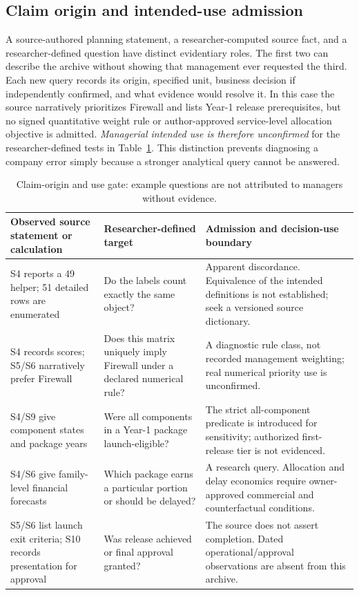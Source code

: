 \documentclass[systems,article,submit,moreauthors]{Definitions/mdpi}
\begin{document}
\subsection{Claim origin and intended-use admission}
A source-authored planning statement, a researcher-computed source fact, and a researcher-defined question have distinct evidentiary roles. The first two can describe the archive without showing that management ever requested the third. Each new query records its origin, specified unit, business decision if independently confirmed, and what evidence would resolve it. In this case the source narratively prioritizes Firewall and lists Year-1 release prerequisites, but no signed quantitative weight rule or author-approved service-level allocation objective is admitted. \emph{Managerial intended use is therefore unconfirmed} for the researcher-defined tests in Table~\ref{tab:origin}. This distinction prevents diagnosing a company error simply because a stronger analytical query cannot be answered.\label{sec:claim-origin}
\begin{table}[H]
\centering\footnotesize
\caption{Claim-origin and use gate: example questions are not attributed to managers without evidence.}
\label{tab:origin}
\begin{tabularx}{\linewidth}{>{\raggedright\arraybackslash}p{2.25cm} >{\raggedright\arraybackslash}p{3.00cm} X}
\toprule
Observed source statement or calculation & Researcher-defined target & Admission and decision-use boundary\\
\midrule
S4 reports a 49 helper; 51 detailed rows are enumerated & Do the labels count exactly the same object? & Apparent discordance. Equivalence of the intended definitions is not established; seek a versioned source dictionary.\\
S4 records scores; S5/S6 narratively prefer Firewall & Does this matrix uniquely imply Firewall under a declared numerical rule? & A diagnostic rule class, not recorded management weighting; real numerical priority use is unconfirmed.\\
S4/S9 give component states and package years & Were all components in a Year-1 package launch-eligible? & The strict all-component predicate is introduced for sensitivity; authorized first-release tier is not evidenced.\\
S4/S6 give family-level financial forecasts & Which package earns a particular portion or should be delayed? & A research query. Allocation and delay economics require owner-approved commercial and counterfactual conditions.\\
S5/S6 list launch exit criteria; S10 records presentation for approval & Was release achieved or final approval granted? & The source does not assert completion. Dated operational/approval observations are absent from this archive.\\
\bottomrule
\end{tabularx}
\end{table}
\end{document}
